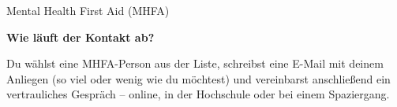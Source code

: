 \begin{initiativkarte}{Mental Health First Aid (MHFA)}
  \vspace{0.5cm}

  \textbf{Wie läuft der Kontakt ab?}

 Du wählst eine MHFA-Person aus der Liste, schreibst eine E-Mail mit deinem Anliegen (so viel oder wenig wie du möchtest) und vereinbarst anschließend ein vertrauliches Gespräch – online, in der Hochschule oder bei einem Spaziergang.
  
  \vspace{0.5cm}


  \vspace{0.6cm}
  \hawrule


\end{initiativkarte}